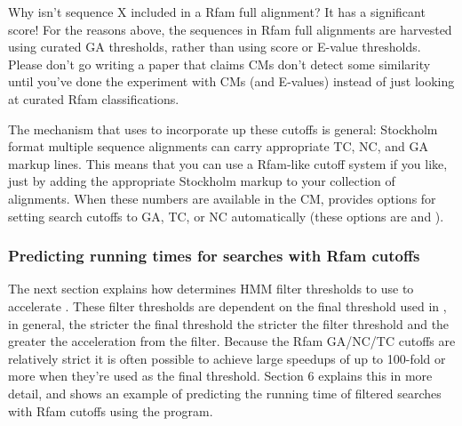 \begin{srefaq}{Why isn't sequence X included in a Rfam full alignment?
It has a significant score!} For the reasons above, the sequences in
Rfam full alignments are harvested using curated GA thresholds, rather
than using score or E-value thresholds. Please don't go writing a
paper that claims CMs don't detect some similarity until you've done
the experiment with CMs (and E-values) instead of just looking at
curated Rfam classifications.
\end{srefaq}

The mechanism that  uses to incorporate up these cutoffs is
general: Stockholm format multiple sequence alignments can carry
appropriate TC, NC, and GA markup lines. This means that you can use a
Rfam-like cutoff system if you like, just by adding the appropriate
Stockholm markup to your collection of alignments. When these numbers
are available in the CM,  provides options
for setting search cutoffs to GA, TC, or NC automatically (these options
are  and ).

\subsubsection{Predicting running times for searches with Rfam cutoffs}
The next section explains how  determines HMM filter
thresholds to use to accelerate . These filter
thresholds are dependent on the final threshold used in
, in general, the stricter the final threshold the
stricter the filter threshold and the greater the acceleration from
the filter. Because the Rfam GA/NC/TC cutoffs are relatively strict it
is often possible to achieve large speedups of up to 100-fold or more
when they're used as the final threshold. Section 6 explains this in
more detail, and shows an example of predicting the running time of
filtered searches with Rfam cutoffs using the  program.



